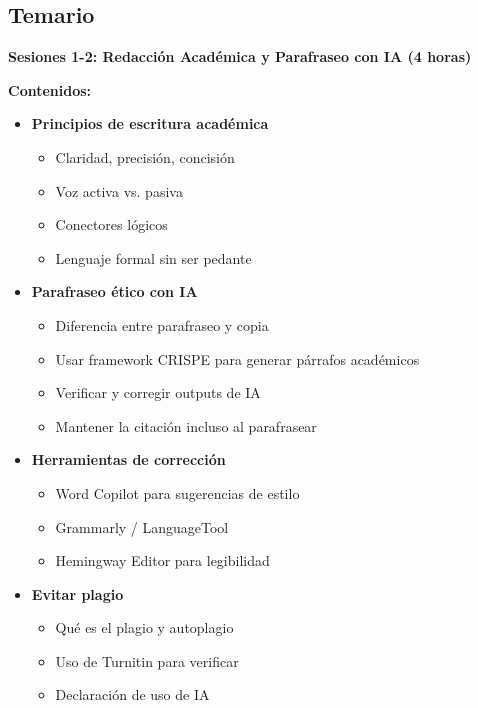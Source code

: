 \documentclass[12pt,a4paper]{yaac-luatex}
\newcommand{\subsecciontitulo}[1]{
	{\color{maincolor}\large\bfseries #1}
}
\begin{document}
	\subsection*{Temario}
	
	\begin{tcolorbox}[
		enhanced,
		colback=white,
		colframe=curso3color,
		arc=3pt,
		boxrule=1.5pt,
		left=10pt,
		right=10pt,
		top=8pt,
		bottom=8pt,
		breakable
		]
		\subsecciontitulo{Sesiones 1-2: Redacción Académica y Parafraseo con IA (4 horas)}
		
		\textbf{Contenidos:}
		\begin{itemize}[leftmargin=*, itemsep=0.1cm]
			\item \textbf{Principios de escritura académica}
			\begin{itemize}
				\item Claridad, precisión, concisión
				\item Voz activa vs. pasiva
				\item Conectores lógicos
				\item Lenguaje formal sin ser pedante
			\end{itemize}
			\item \textbf{Parafraseo ético con IA}
			\begin{itemize}
				\item Diferencia entre parafraseo y copia
				\item Usar framework CRISPE para generar párrafos académicos
				\item Verificar y corregir outputs de IA
				\item Mantener la citación incluso al parafrasear
			\end{itemize}
			\item \textbf{Herramientas de corrección}
			\begin{itemize}
				\item Word Copilot para sugerencias de estilo
				\item Grammarly / LanguageTool
				\item Hemingway Editor para legibilidad
			\end{itemize}
			\item \textbf{Evitar plagio}
			\begin{itemize}
				\item Qué es el plagio y autoplagio
				\item Uso de Turnitin para verificar
				\item Declaración de uso de IA
			\end{itemize}
		\end{itemize}
		

\end{tcolorbox}
\end{document}
